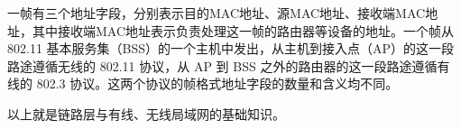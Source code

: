 \documentclass[UTF8]{ctexart}
\begin{document}
一帧有三个地址字段，分别表示目的MAC地址、源MAC地址、接收端MAC地址，其中接收端MAC地址表示负责处理这一帧的路由器等设备的地址。一个帧从 802.11 基本服务集（BSS）的一个主机中发出，从主机到接入点（AP）的这一段路途遵循无线的 802.11 协议，从 AP 到 BSS 之外的路由器的这一段路途遵循有线的 802.3 协议。这两个协议的帧格式地址字段的数量和含义均不同。

以上就是链路层与有线、无线局域网的基础知识。

\newpage
{}
\BgThispage
\printindex
\end{document}
